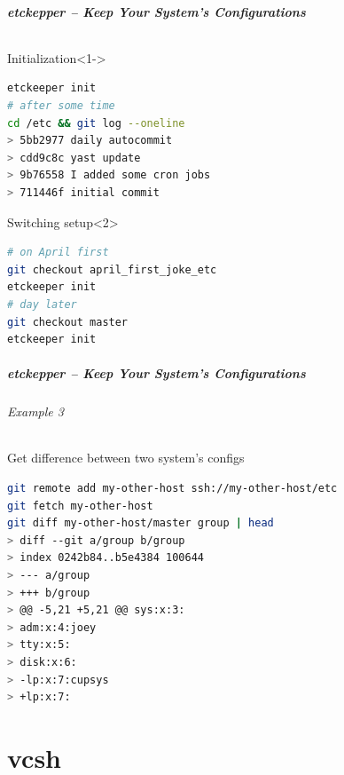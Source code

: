 \documentclass[english,hyperref={pdfpagelabels=false},aspectratio=169]{beamer}
\begin{document}
\begin{frame}[fragile]
  \frametitle{etckepper -- Keep Your System's Configurations}
  \framesubtitle{}
  \begin{block}{Initialization}<1->
    \vspace{-0.75em}
    \begin{lstlisting}[language=zsh]
etckeeper init
# after some time
cd /etc && git log --oneline
> 5bb2977 daily autocommit
> cdd9c8c yast update
> 9b76558 I added some cron jobs
> 711446f initial commit
    \end{lstlisting}
    \vspace{-0.75em}
  \end{block}
  \begin{block}{Switching setup}<2>
    \vspace{-0.75em}
    \begin{lstlisting}[language=zsh]
# on April first
git checkout april_first_joke_etc
etckeeper init
# day later
git checkout master
etckeeper init
    \end{lstlisting}
    \vspace{-0.75em}
  \end{block}
\end{frame}

\begin{frame}[fragile]
  \frametitle{etckepper -- Keep Your System's Configurations}
  \framesubtitle{Example 3}
  \begin{block}{Get difference between two system's configs}
    \vspace{-0.75em}
    \begin{lstlisting}[language=zsh]
git remote add my-other-host ssh://my-other-host/etc
git fetch my-other-host
git diff my-other-host/master group | head
> diff --git a/group b/group
> index 0242b84..b5e4384 100644
> --- a/group
> +++ b/group
> @@ -5,21 +5,21 @@ sys:x:3:
> adm:x:4:joey
> tty:x:5:
> disk:x:6:
> -lp:x:7:cupsys
> +lp:x:7:
    \end{lstlisting}
    \vspace{-0.75em}
  \end{block}
\end{frame}


\part{vcsh}
\makepart
\end{document}

